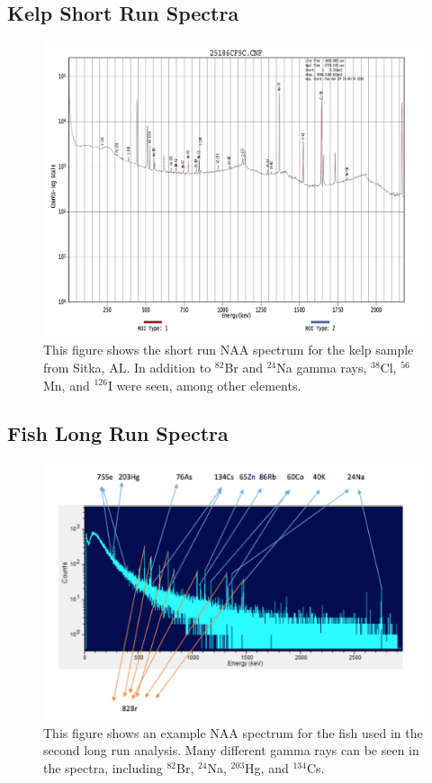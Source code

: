 \documentclass[]{article}
\begin{document}
\subsection{Kelp Short Run Spectra}
\begin{figure}[htb!]
\centering
\includegraphics[scale=0.18]{SampleB}
\caption{This figure shows the short run NAA spectrum for the kelp sample from Sitka, AL. In addition to $^{82}$Br and $^{24}$Na gamma rays, $^{38}$Cl, $^{56}$Mn, and $^{126}$I were seen, among other elements.}
\end{figure} 

\pagebreak

\subsection{Fish Long Run Spectra}

\begin{figure}[htb!]
\centering
\includegraphics[scale=0.7]{FishSpectra}
\caption{This figure shows an example NAA spectrum for the fish used in the second long run analysis. Many different gamma rays can be seen in the spectra, including $^{82}$Br, $^{24}$Na, $^{203}$Hg, and $^{134}$Cs.}
\end{figure} 
\end{document}
